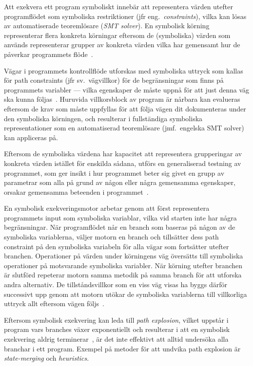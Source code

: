 Att exekvera ett program symboliskt innebär att representera värden utefter
programflödet som symboliska restriktioner (jfr eng.\ \emph{constraints}), vilka kan
lösas av automatiserade teoremlösare (\emph{SMT solver}). En symbolisk körning
representerar flera konkreta körningar eftersom de (symboliska) värden som
används representerar grupper av konkreta värden vilka har gemensamt hur de
påverkar programmets flöde~\cite{klee}.

Vägar i programmets kontrollflöde utforskas med symboliska uttryck som kallas
för path constraints (jfr sv.\ vägvillkor) för de begränsningar som finns på
programmets variabler --- vilka egenskaper de måste uppnå för att just denna väg
ska kunna följas~\cite{klee}. Huruvida villkorsblock av program är nårbara kan
evalueras eftersom de krav som måste uppfyllas för att följa vägen dit dokumenteras
under den symboliska körningen, och resulterar i fullständiga symboliska representationer
som en automatiserad teoremlösare (jmf.\ engelska SMT solver) kan appliceras på.

Eftersom de symboliska värdena har kapacitet att representera grupperingar av konkreta
värden istället för enskilda sådana, utförs en generaliserad testning av programmet,
som ger insikt i hur programmet beter sig givet en grupp av parametrar som alla
på grund av någon eller några gemensamma egenskaper, orsakar gemensamma beteenden
i programmet~\cite{Cadar}.

En symbolisk exekveringsmotor arbetar genom att först representera programmets
input som symboliska variablar, vilka vid starten inte har några begränsningar.
När programflödet når en branch som baseras på någon av de symboliska
variablerna, väljer motorn en branch och tillsätter dess path constraint på den
symboliska variabeln för alla vägar som fortsätter utefter branchen. Operationer
på värden under körningens väg översätts till symboliska operationer på
motsvarande symboliska variabler. När körning utefter branchen är
slutförd repeterar motorn samma metodik på samma branch för att utforska andra
alternativ. De tillståndsvillkor som en viss väg visas ha byggs därför
successivt upp genom att motorn utökar de symboliska variablerna till
villkorliga uttryck allt eftersom vägen följs~\cite{klee}.

Eftersom symbolisk exekvering kan leda till \emph{path explosion}, vilket
uppstår i program vars branches växer exponentiellt och resulterar i att en
symbolisk exekvering aldrig terminerar~\cite{path_explo}, är det inte effektivt
att alltid undersöka alla branchar i ett program. Exempel på metoder för att
undvika path explosion är \emph{state-merging} och \emph{heuristics}.

